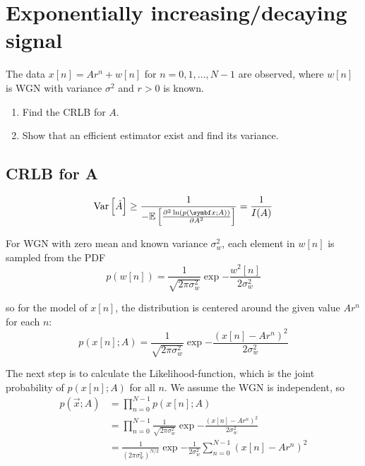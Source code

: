 \section{Exponentially increasing/decaying signal}\label{sec:task02}

\begin{note-block}
The data $x[n] = A r^n + w[n]$ for $n = 0, 1, \ldots, N - 1$ are observed, where $w[n]$ is WGN with
variance $\sigma^2$ and $r > 0$ is known.
\begin{enumerate}[label={(\alph*)}]
\item Find the CRLB for $A$.
\item Show that an efficient estimator exist and find its variance.
\end{enumerate}
\end{note-block}

\subsection{CRLB for A}

\begin{theorem-block}
\begin{equation}
    \Var{\hat A} \geq \dfrac{1}{-\E{\pnd[\ln(p(\vec{x};A))]{2}{A}}} = \frac{1}{I(A)}
\end{equation} 
\end{theorem-block}

For \acs{WGN} with zero mean and known variance $\sigma^2_w$, each element in $w[n]$ is sampled from the \acs{PDF}
\begin{equation}
    p(w[n]) = \frac{1}{\sqrt{2\pi\sigma_w^2}}\exp{-\frac{w^2[n]}{2\sigma_w^2}}
\end{equation}


so for the model of $x[n]$, the distribution is centered around the given value $A r^n$ for each $n$:
\begin{equation}
    p(x[n];A) = \frac{1}{\sqrt{2\pi\sigma_w^2}} \exp{-\frac{(x[n] - Ar^n)^2}{2\sigma_w^2}}
\end{equation}

The next step is to calculate the Likelihood-function, which is the joint probability of $p(x[n];A)$ for all $n$. We assume the \acs{WGN} is independent, so
\begin{align*}
    p(\vec{x};A)
    &= \prod_{n=0}^{N-1} p(x[n];A) \\
    &= \prod_{n=0}^{N-1} \frac{1}{\sqrt{2\pi\sigma_w^2}} \exp{-\frac{(x[n] - Ar^n)^2}{2\sigma_w^2}} \\
    &= \frac{1}{(2\pi\sigma_w^2)^{N/2}} \exp{-\frac{1}{2\sigma_w^2}\sum_{n=0}^{N-1} (x[n] - Ar^n)^2}
\end{align*}

